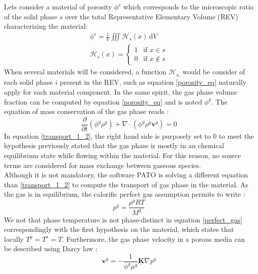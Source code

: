 \documentclass[english,10pt,a4paper,oneside,twocolumn,titlepage]{report}
\begin{document}
	Lets consider a material of porosity $\phi^s$ which 
	corresponds to the microscopic ratio of the solid phase $s$
	over the total Representative Elementary Volume 
	(REV)\cite{Whitaker1999} characterizing the material:
	\begin{align}
	\label{porosity_eq}
	\phi^s = \frac{1}{V}\iiint \mathcal{H}_s(x) \,
	 \mathrm{d}V
	\\ \label{heavy_material}
	\mathcal{H}_s(x)  = 
	\begin{cases} 
	1 & \text{if } x \in s \\
	0 & \text{if } x \notin s
	\end{cases}
	\end{align}
	When several materials will be considered, a function 
	$\mathcal{H}_{s_i}$ would be consider of each solid 
	phase $i$ present in the REV, 
	such as equation \eqref{porosity_eq} naturally apply for
	each material component. In the same spirit, 
	the gas phase
	volume fraction can be computed by equation
	\eqref{porosity_eq} and is noted $\phi^g$.
	The equation of mass conservation of the gas phase 
	reads \cite{Whitaker1999}:
	\begin{equation}
	\label{transport_1_2}
	\frac{\partial}{\partial t} \left( \phi^g \rho^g\right)
	+ \nabla \cdot \left(\phi^g \rho^g\mathbf{v}^g \right)
	= 0
	\end{equation}
	In equation \eqref{transport_1_2}, the right hand side 
	is purposely set to 0 to meet the hypothesis previously 
	stated that the gas phase is mostly in an chemical 
	equilibrium state while flowing within the material. For this
	reason, no source terms are considered for mass 
	exchange between gaseous species. \\
	Although it is not mandatory, the software PATO is 
	solving a different equation than \eqref{transport_1_2} to
	compute the transport of gas phase in the material. As
	the gas is in equilibrium, the calorific perfect gas 
	assumption permits to write :
	\begin{equation}
	\label{perfect_gas}
	p^g = \frac{\rho^g RT }{M^g}
	\end{equation}
	We not that phase temperature is not phase-distinct in 
	equation \eqref{perfect_gas} correspondingly with the 
	first hypothesis on the material, which states that locally
	$T^g = T^s = T$. Furthermore, the gas phase velocity
	in a porous media can be described using Darcy law
	\cite{Whitaker1999} :
	\begin{equation}
	\label{Darcy}
	\mathbf{v}^g = -\frac{1}{\phi^g\mu^g} 
	\underline{\mathbf{K}}
	\nabla p^g
	\end{equation}
\end{document}
